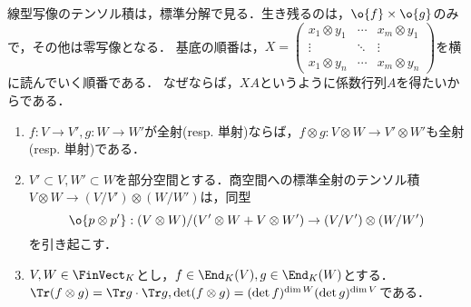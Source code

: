 \documentclass[uplatex, dvipdfmx]{jsreport}
\begin{document}
\begin{remarks}
    線型写像のテンソル積は，標準分解で見る．生き残るのは，$\o{f}\times\o{g}$のみで，その他は零写像となる．
    基底の順番は，$X=\begin{pmatrix}x_1\otimes y_1&\cdots&x_m\otimes y_1\\\vdots&\ddots&\vdots\\x_1\otimes y_n&\cdots&x_m\otimes y_n\end{pmatrix}$を横に読んでいく順番である．
    なぜならば，$XA$というように係数行列$A$を得たいからである．
\end{remarks}

\begin{corollary}\label{cor-tensor-product-of-linear-maps}\mbox{}
    \begin{enumerate}
        \item $f:V\to V',g:W\to W'$が全射(resp. 単射)ならば，$f\otimes g:V\otimes W\to V'\otimes W'$も全射(resp. 単射)である．
        \item $V'\subset V,W'\subset W$を部分空間とする．商空間への標準全射のテンソル積$V\otimes W\to(V/V')\otimes(W/W')$は，同型\[\o{p\otimes p'}:(V\otimes W)/(V'\otimes W+V\otimes W')\to (V/V')\otimes(W/W')\]を引き起こす．
        \item $V,W\in\FinVect_K$とし，$f\in\End_K(V),g\in\End_K(W)$とする．$\Tr(f\otimes g)=\Tr g\cdot\Tr g,\det(f\otimes g)=(\det f)^{\dim W}(\det g)^{\dim V}$である．
    \end{enumerate}
\end{corollary}
\end{document}
